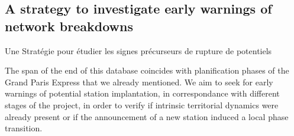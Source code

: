 \subsection{A strategy to investigate early warnings of network breakdowns}{Une Stratégie pour étudier les signes précurseurs de rupture de potentiels}


The span of the end of this database coincides with planification phases of the Grand Paris Express that we already mentioned. 
 We aim to seek for early warnings of potential station implantation, in correspondance with different stages of the project, in order to verify if intrinsic territorial dynamics were already present or if the announcement of a new station induced a local phase transition.











